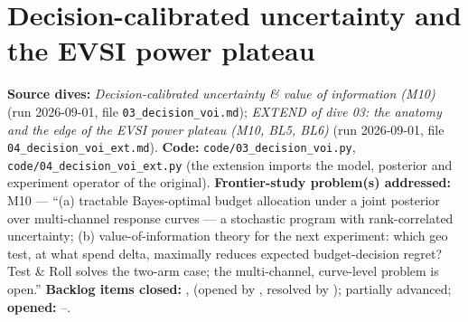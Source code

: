 \chapter[Decision value of information]{Decision-calibrated uncertainty and the EVSI power plateau}
\label{ch:voi}

\begin{provenance}
\textbf{Source dives:}  \emph{Decision-calibrated uncertainty \& value of information (M10)} (run 2026-09-01, file \texttt{03\_decision\_voi.md});  \emph{EXTEND of dive 03: the anatomy and the edge of the EVSI power plateau (M10, BL5, BL6)} (run 2026-09-01, file \texttt{04\_decision\_voi\_ext.md}).
\textbf{Code:} \texttt{code/03\_decision\_voi.py}, \texttt{code/04\_decision\_voi\_ext.py} (the extension imports the model, posterior and experiment operator of the original).
\textbf{Frontier-study problem(s) addressed:} M10 --- ``(a) tractable Bayes-optimal budget allocation under a joint posterior over multi-channel response curves --- a stochastic program with rank-correlated uncertainty; (b) value-of-information theory for the next experiment: which geo test, at what spend delta, maximally reduces expected budget-decision regret? Test \& Roll solves the two-arm case; the multi-channel, curve-level problem is open.''
\textbf{Backlog items closed:} ,  (opened by , resolved by );  partially advanced; \textbf{opened:} --.
\end{provenance}

